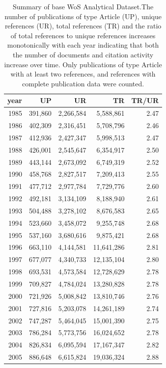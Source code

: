 \documentclass[NETN]{stjour}
\begin{document}
\begin{table}[ht]
\caption{Summary of base WoS Analytical Dataset.The number of publications of type Article (UP), unique references (UR), total references (TR) and the ratio of total references to unique references increases monotonically with each year indicating that both the number of documents and citation activity increase over time. Only publications of type Article with at least two references, and references with complete publication data were counted.} 
\label{tab:summary_data}
\centering
\begin{tabular}{|r rrrr|}
  \hline
year & UP & UR & TR & TR/UR \\ 
  \hline
1985 & 391,860 & 2,266,584 & 5,588,861 & 2.47 \\ 
  \hline
1986 & 402,309 & 2,316,451 & 5,708,796 & 2.46 \\ 
1987 & 412,936 & 2,427,347 & 5,998,513 & 2.47 \\ 
1988 & 426,001 & 2,545,647 & 6,354,917 & 2.50 \\ 
1989 & 443,144 & 2,673,092 & 6,749,319 & 2.52 \\ 
1990 & 458,768 & 2,827,517 & 7,209,413 & 2.55 \\ 
1991 & 477,712 & 2,977,784 & 7,729,776 & 2.60 \\ 
1992 & 492,181 & 3,134,109 & 8,188,940 & 2.61 \\ 
1993 & 504,488 & 3,278,102 & 8,676,583 & 2.65 \\ 
1994 & 523,660 & 3,458,072 & 9,255,748 & 2.68 \\ 
  \hline
1995 & 537,160 & 3,680,616 & 9,875,421 & 2.68 \\ 
  \hline
1996 & 663,110 & 4,144,581 & 11,641,286 & 2.81 \\ 
1997 & 677,077 & 4,340,733 & 12,135,104 & 2.80 \\ 
1998 & 693,531 & 4,573,584 & 12,728,629 & 2.78 \\ 
1999 & 709,827 & 4,784,024 & 13,280,828 & 2.78 \\ 
2000 & 721,926 & 5,008,842 & 13,810,746 & 2.76 \\ 
2001 & 727,816 & 5,203,078 & 14,261,189 & 2.74 \\ 
2002 & 747,287 & 5,464,045 & 15,001,390 & 2.75 \\ 
2003 & 786,284 & 5,773,756 & 16,024,652 & 2.78 \\ 
 2004 & 826,834 & 6,095,594 & 17,167,347 & 2.82 \\ 
   \hline
 2005 & 886,648 & 6,615,824 & 19,036,324 & 2.88 \\ 
 \hline
\end{tabular}
\end{table}
\end{document}
